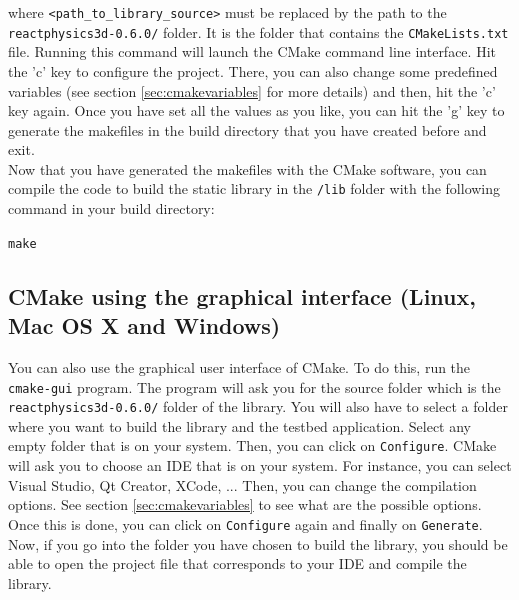 \documentclass[a4paper,12pt]{article}
\begin{document}
    \begin{sloppypar}
    where \texttt{\textless path\_to\_library\_source\textgreater} must be replaced
    by the path to the \texttt{reactphysics3d-0.6.0/} folder. It is the folder that
    contains the \texttt{CMakeLists.txt} file. Running this command will launch the CMake command line interface.
    Hit the 'c' key to configure the project. There, you can also change some predefined variables (see section \ref{sec:cmakevariables} for more details)
    and then, hit the 'c' key again. Once you have set all the values as you like, you can hit the 'g' key to generate the makefiles in the build directory
    that you have created before and exit. \\

    Now that you have generated the makefiles with the CMake software, you can compile the code to build the static library in the
    \texttt{/lib} folder with the following command in your build directory: \\

    \end{sloppypar}

    \texttt{make}

    \subsection{CMake using the graphical interface (Linux, Mac OS X and Windows)}

     You can also use the graphical user interface of CMake. To do this,
     run the \texttt{cmake-gui} program. The program will ask you for the
     source folder which is the \texttt{reactphysics3d-0.6.0/} folder of
     the library. You will also have to select a folder where you want to
     build the library and the testbed application. Select any empty folder that
     is on your system. Then, you can click on \texttt{Configure}. CMake will ask you to choose an IDE that is on
     your system. For instance, you can select Visual Studio, Qt Creator, XCode, ... Then, you
     can change the compilation options. See section \ref{sec:cmakevariables} to see what are the possible options.
     Once this is done, you can click on \texttt{Configure} again and finally on \texttt{Generate}. \\

     Now, if you go into the folder you have chosen to build the
     library, you should be able to open the project file that corresponds to your IDE and compile
     the library. \\
\end{document}

